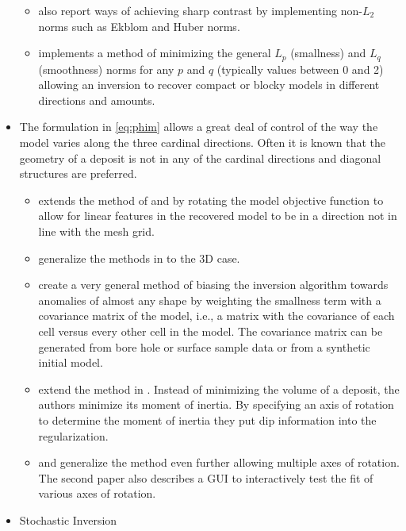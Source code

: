 \begin{itemize}
\begin{itemize}
\begin{itemize}
	\end{itemize}
\item \cite{farquharson1998non} also report ways of achieving sharp contrast by implementing non-$L_2$ norms such as Ekblom and Huber norms.
\item \cite{fournier2015cooperative} implements a method of minimizing the general $L_p$ (smallness) and $L_q$ (smoothness) norms for any $p$ and $q$ (typically values between 0 and 2) allowing an inversion to recover compact or blocky models in different directions and amounts.
\end{itemize}
\item The formulation in \autoref{eq:phim} allows a great deal of control of the way the model varies along the three cardinal directions. Often it is known that the geometry of a deposit is not in any of the cardinal directions and diagonal structures are preferred.
\begin{itemize}
\item \cite{li2000incorporating}  extends the method of \cite{li19963} and \cite{li19983} by rotating the model objective function to allow for linear features in the recovered model to be in a direction not in line with the mesh grid.
\item \cite{lelievre2009comprehensive} generalize the methods in \cite{li2000incorporating} to the 3D case.
\item \cite{chasseriau20033d} create a very general method of biasing the inversion algorithm towards anomalies of almost any shape by weighting the smallness term with a covariance matrix of the model, i.e., a matrix with the covariance of each cell versus every other cell in the model. The covariance matrix can be generated from bore hole or surface sample data or from a synthetic initial model.
\item \cite{guillen1984gravity} extend the method in \cite{last1983compact}. Instead of minimizing the volume of a deposit, the authors minimize its moment of inertia. By specifying an axis of rotation to determine the moment of inertia they put dip information into the regularization.
\item \cite{barbosa1994generalized} and \cite{barbosa2006interactive} generalize the method even further allowing multiple axes of rotation. The second paper also describes a GUI to interactively test the fit of various axes of rotation.
\end{itemize}
\item Stochastic Inversion
\begin{itemize}

\end{itemize}
\end{itemize}

